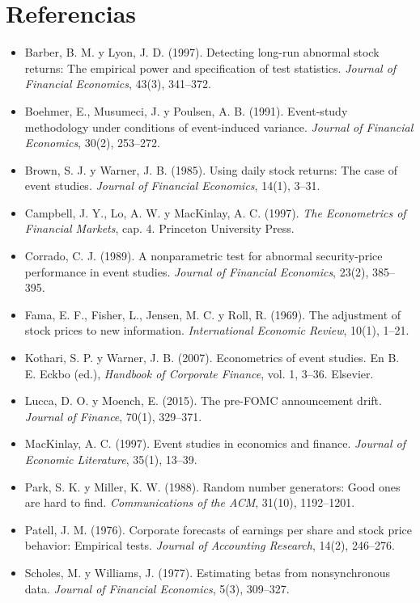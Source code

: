 \section*{Referencias}
\begin{itemize}[leftmargin=*]
  \item Barber, B. M. y Lyon, J. D. (1997). Detecting long-run abnormal stock returns: The empirical power and specification
        of test statistics. \emph{Journal of Financial Economics}, 43(3), 341--372.
  \item Boehmer, E., Musumeci, J. y Poulsen, A. B. (1991). Event-study methodology under conditions of event-induced
        variance. \emph{Journal of Financial Economics}, 30(2), 253--272.
  \item Brown, S. J. y Warner, J. B. (1985). Using daily stock returns: The case of event studies. \emph{Journal of Financial
        Economics}, 14(1), 3--31.
  \item Campbell, J. Y., Lo, A. W. y MacKinlay, A. C. (1997). \emph{The Econometrics of Financial Markets}, cap. 4. Princeton
        University Press.
  \item Corrado, C. J. (1989). A nonparametric test for abnormal security-price performance in event studies. \emph{Journal
        of Financial Economics}, 23(2), 385--395.
  \item Fama, E. F., Fisher, L., Jensen, M. C. y Roll, R. (1969). The adjustment of stock prices to new information.
        \emph{International Economic Review}, 10(1), 1--21.
  \item Kothari, S. P. y Warner, J. B. (2007). Econometrics of event studies. En B. E. Eckbo (ed.), \emph{Handbook of
        Corporate Finance}, vol. 1, 3--36. Elsevier.
  \item Lucca, D. O. y Moench, E. (2015). The pre-FOMC announcement drift. \emph{Journal of Finance}, 70(1), 329--371.
  \item MacKinlay, A. C. (1997). Event studies in economics and finance. \emph{Journal of Economic Literature}, 35(1), 13--39.
  \item Park, S. K. y Miller, K. W. (1988). Random number generators: Good ones are hard to find. \emph{Communications of the
        ACM}, 31(10), 1192--1201.
  \item Patell, J. M. (1976). Corporate forecasts of earnings per share and stock price behavior: Empirical tests.
        \emph{Journal of Accounting Research}, 14(2), 246--276.
  \item Scholes, M. y Williams, J. (1977). Estimating betas from nonsynchronous data. \emph{Journal of Financial Economics},
        5(3), 309--327.
\end{itemize}
